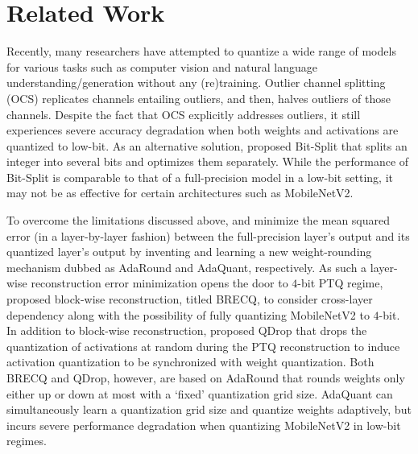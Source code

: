 \documentclass{article}
\theoremstyle{plain}
\theoremstyle{definition}
\theoremstyle{remark}
\begin{document}
\section{Related Work}\label{sec:related}
Recently, many researchers have attempted to quantize a wide range of models for various tasks such as computer vision and natural language understanding/generation without any (re)training. Outlier channel splitting (OCS) \citep{zhao2019improving} replicates channels entailing outliers, and then, halves outliers of those channels. Despite the fact that OCS explicitly addresses outliers, it still experiences severe accuracy degradation when both weights and activations are quantized to low-bit. As an alternative solution, \citet{wang2020towards} proposed Bit-Split that splits an integer into several bits and optimizes them separately.
While the performance of Bit-Split is comparable to that of a full-precision model in a low-bit setting, it may not be as effective for certain architectures such as MobileNetV2.

To overcome the limitations discussed above, \citet{nagel2020adaround} and \citet{hubara2021adaquant} minimize the mean squared error  (in a layer-by-layer fashion) between the full-precision layer's output and its quantized layer's output by inventing and learning a new weight-rounding mechanism dubbed as AdaRound and AdaQuant, respectively. As such a layer-wise reconstruction error minimization opens the door to $4$-bit PTQ regime, \citet{li2021brecq} proposed block-wise reconstruction, titled BRECQ, to consider cross-layer dependency along with the possibility of fully quantizing MobileNetV2 to $4$-bit. In addition to block-wise reconstruction, \citet{wei2022qdrop} proposed QDrop that drops the quantization of activations at random during the PTQ reconstruction to induce activation quantization to be synchronized with weight quantization. Both BRECQ and QDrop, however, are based on AdaRound that 
rounds weights only either up or down at most with a `fixed' quantization grid size.
AdaQuant can simultaneously learn a quantization grid size and quantize weights adaptively, but incurs severe performance degradation when quantizing MobileNetV2 in low-bit regimes. %
\end{document}
